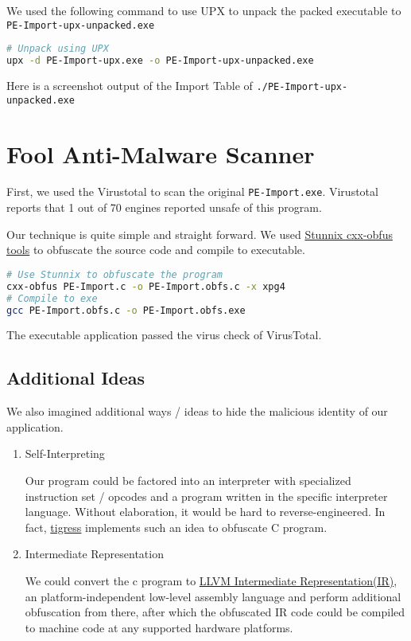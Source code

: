 \documentclass[11pt]{article}
\begin{document}
We used the following command to use UPX to unpack the packed executable to \lstinline{PE-Import-upx-unpacked.exe}
\begin{lstlisting}[language=bash]
# Unpack using UPX
upx -d PE-Import-upx.exe -o PE-Import-upx-unpacked.exe
\end{lstlisting}

Here is a screenshot output of the Import Table of \lstinline{./PE-Import-upx-unpacked.exe} 

\section{Fool Anti-Malware Scanner}

First, we used the Virustotal to scan the original \lstinline{PE-Import.exe}. Virustotal reports that 1 out of 70 engines reported unsafe of this program. 

Our technique is quite simple and straight forward. We used \href{http://stunnix.com/prod/cxxo/}{Stunnix cxx-obfus tools} to obfuscate the source code and compile to executable. 

\begin{lstlisting}[language=bash]
# Use Stunnix to obfuscate the program
cxx-obfus PE-Import.c -o PE-Import.obfs.c -x xpg4
# Compile to exe
gcc PE-Import.obfs.c -o PE-Import.obfs.exe
\end{lstlisting}

The executable application passed the virus check of VirusTotal.

\subsection{Additional Ideas}
We also imagined additional ways / ideas to hide the malicious identity of our application.
\begin{enumerate}
    \item Self-Interpreting \par
    Our program could be factored into an interpreter with specialized instruction set / opcodes and a program written in the specific interpreter language. Without elaboration, it would be hard to reverse-engineered. In fact, \href{http://tigress.cs.arizona.edu/index.html}{tigress} implements such an idea to obfuscate C program.
    \item Intermediate Representation\par
    We could convert the c program to \href{https://llvm.org/docs/index.html}{LLVM Intermediate Representation(IR)}, an platform-independent low-level assembly language and perform additional obfuscation from there, after which the obfuscated IR code could be compiled to machine code at any supported hardware platforms. 
    
\end{enumerate}
\end{document}
